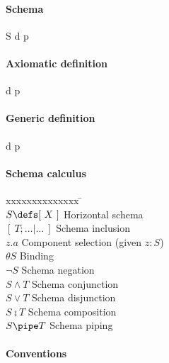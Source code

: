 \paragraph{Schema}

\begin{schema}{S}
	d
\where
	p
\end{schema}

\newpage


\paragraph{Axiomatic definition}

\begin{axdef}
	d
\where
	p
\end{axdef}

\paragraph{Generic definition}

\begin{gendef}[a, \dots]
	d
\where
	p
\end{gendef}

\paragraph{Schema calculus}

\begin{tabbing}
xxxxxxxxxxxxxx \= \kill \\ 
$S \defs [~ X ~]$ \> Horizontal schema \\
$[~ T; \dots | \dots ~]$  \> Schema inclusion \\
$z.a$ \> Component selection (given $z:S$) \\
$\theta S$ \> Binding \\
$\lnot S$ \> Schema negation \\
$S \land T$ \> Schema conjunction \\
$S \lor T$ \> Schema disjunction \\
$S \semi T$ \> Schema composition \\
$S \pipe T$ \> Schema piping \\
\end{tabbing}

\paragraph{Conventions}

